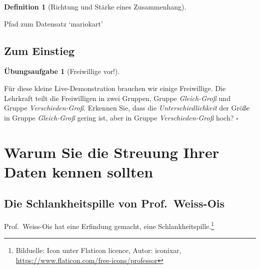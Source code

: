 \documentclass[
  a4paper,
  DIV=11]{scrreprt}
\newenvironment{Shaded}{\begin{snugshade}}{\end{snugshade}}
\newcommand{\FunctionTok}[1]{\textcolor[rgb]{0.28,0.35,0.67}{#1}}
\newcommand{\NormalTok}[1]{\textcolor[rgb]{0.00,0.23,0.31}{#1}}
\newcommand{\OtherTok}[1]{\textcolor[rgb]{0.00,0.23,0.31}{#1}}
\newcommand{\StringTok}[1]{\textcolor[rgb]{0.13,0.47,0.30}{#1}}
\theoremstyle{definition}
\newtheorem{exercise}{Übungsaufgabe}[chapter]
\theoremstyle{definition}
\theoremstyle{definition}
\newtheorem{definition}{Definition}[chapter]
\theoremstyle{remark}
\begin{document}
\begin{definition}[Richtung und Stärke eines
Zusammenhang]
\begin{codelisting}
\caption{\label{lst-mario-path}Pfad zum Datensatz `mariokart'}

\centering{

\begin{Shaded}
\begin{Highlighting}[]
\NormalTok{mariokart\_path }\OtherTok{\textless{}{-}} \FunctionTok{paste0}\NormalTok{(}
  \StringTok{"https://vincentarelbundock.github.io/Rdatasets/"}\NormalTok{,}
  \StringTok{"csv/openintro/mariokart.csv"}\NormalTok{)}

\NormalTok{mariokart }\OtherTok{\textless{}{-}} \FunctionTok{read.csv}\NormalTok{(mariokart\_path)}
\end{Highlighting}
\end{Shaded}

}

\end{codelisting}%

\subsection{Zum Einstieg}\label{zum-einstieg-1}

\begin{exercise}[Freiwillige
vor!]\protect\hypertarget{exr-streuung-erkennen}{}\label{exr-streuung-erkennen}

Für diese kleine Live-Demonstration brauchen wir einige Freiwillige. Die
Lehrkraft teilt die Freiwilligen in zwei Gruppen, Gruppe
\emph{Gleich-Groß} und Gruppe \emph{Verschieden-Groß}. Erkennen Sie,
dass die \emph{Unterschiedlichkeit} der Größe in Gruppe
\emph{Gleich-Groß} gering ist, aber in Gruppe \emph{Verschieden-Groß}
hoch? \(\square\)

\end{exercise}

\section{Warum Sie die Streuung Ihrer Daten kennen
sollten}\label{warum-sie-die-streuung-ihrer-daten-kennen-sollten}

\subsection{Die Schlankheitspille von
Prof.~Weiss-Ois}\label{sec-weiss-ois}

Prof.~Weiss-Ois hat eine Erfindung gemacht, eine
Schlankheitspille.\footnote{Bilduelle: Icon unter Flaticon licence,
  Autor: iconixar, \url{https://www.flaticon.com/free-icons/professor}}


\end{definition}
\end{document}

